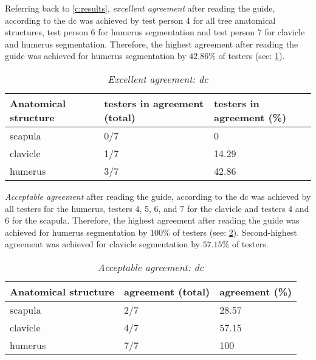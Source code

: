 \noindent
Referring back to \cref{c:results}, \textit{excellent agreement} after reading the guide,
according to the \acrlong{dc} was achieved by test person 4 for all tree anatomical structures,
test person 6 for humerus segmentation
and test person 7 for clavicle and humerus segmentation.
Therefore, the highest agreement after reading the guide was achieved for humerus segmentation by $42.86\%$ of testers (see: \cref{tab:dc-excellent}).
\begin{table}[ht]
	\begin{center}
		\begin{tabular}{l l l}
			\textbf{Anatomical structure} & testers in agreement (total) & testers in  agreement (\%) \\
			\hline
			scapula                       & 0/7                          & 0                          \\
			clavicle                      & 1/7                          & 14.29                      \\
			humerus                       & 3/7                          & 42.86                      \\
		\end{tabular}
		\caption{\textit{Excellent agreement: \acrshort{dc}}}\label{tab:dc-excellent}
	\end{center}
\end{table}

\noindent
\textit{Acceptable agreement} after reading the guide, according to the \acrshort{dc} was achieved by all testers for the humerus,
testers 4, 5, 6, and 7 for the clavicle
and testers 4 and 6 for the scapula.
Therefore, the highest agreement after reading the guide was achieved for humerus segmentation by $100\%$ of testers (see: \cref{tab:dc-acceptable}).
Second-highest agreement was achieved for clavicle segmentation by $57.15\%$ of testers.
\begin{table}[ht]
	\begin{center}
		\begin{tabular}{l l l}
			\textbf{Anatomical structure} & agreement (total) & agreement (\%) \\
			\hline
			scapula                       & 2/7               & 28.57          \\
			clavicle                      & 4/7               & 57.15          \\
			humerus                       & 7/7               & 100            \\
		\end{tabular}
		\caption{\textit{Acceptable agreement: \acrshort{dc}}}\label{tab:dc-acceptable}
	\end{center}
\end{table}

